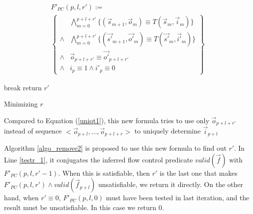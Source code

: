 \documentclass[conference]{IEEEtran}
\begin{document}



\begin{multline}\label{uniqt11}
F'_{PC}(p,l,r'):=\\
\left\{
\begin{array}{cc}
&\bigwedge_{m=0}^{p+l+r'}
\{
(\vec{s}_{m+1},\vec{o}_m)\equiv T(\vec{s}_m,\vec{i}_m)
\}
\\
\wedge&\bigwedge_{m=0}^{p+l+r'}
\{
(\vec{s'}_{m+1},\vec{o'}_m)\equiv T(\vec{s'}_m,\vec{i'}_m)
\}
\\
\wedge&\vec{o}_{p+l+r'}\equiv \vec{o'}_{p+l+r'} \\
\wedge& i_{p}\equiv 1 \wedge  i'_{p}\equiv 0 
\end{array}
\right\}
\end{multline}


\begin{algorithm}[t]
\SetAlgoVlined
{} {
   {
    break
  }
}
return $r'$
\caption{Minimizing $r$}
\label{algo_remove2}
\end{algorithm}

Compared to Equation (\ref{uniqt1}),
this new formula tries to use only $\vec{o}_{p+l+r'}$ instead of 
sequence $<\vec{o}_{p+l},\dots,\vec{o}_{p+l+r}>$ to uniquely determine $\vec{i}_{p+l}$

Algorithm \ref{algo_remove2} is proposed to use this new formula to find out $r'$.
In Line \ref{testr_1},
it conjugates the inferred flow control predicate $valid(\vec{f})$  with $F'_{PC}(p,l,r'-1)$.
When this is satisfiable,
then $r'$ is the last one that makes $F'_{PC}(p,l,r')\wedge valid(\vec{f}_{p+l})$ unsatisfiable,
we return it directly.
On the other hand,
when $r'\equiv 0$,
$F'_{PC}(p,l,0)$ must have been tested in last iteration,
and the result must be unsatisfiable.
In this case we return $0$.
\end{document}

